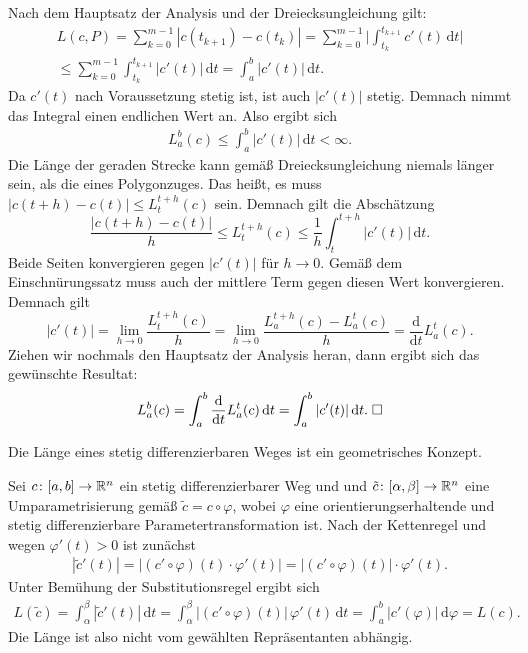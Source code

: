 \noindent{}
Nach dem Hauptsatz der Analysis und der Dreiecksungleichung gilt:
\begin{gather}
L(c,P) = \sum_{k=0}^{m-1} |c(t_{k+1})-c(t_k)|
= \sum_{k=0}^{m-1} \Big|\int_{t_k}^{t_{k+1}}c'(t)\,\mathrm dt\Big|\\
\le \sum_{k=0}^{m-1} \int_{t_k}^{t_{k+1}} |c'(t)|\,\mathrm dt
= \int_a^b |c'(t)|\,\mathrm dt.
\end{gather}
Da $c'(t)$ nach Voraussetzung stetig ist, ist auch $|c'(t)|$
stetig. Demnach nimmt das Integral einen endlichen Wert an. Also ergibt
sich
\begin{gather}
L_a^b(c) \le \int_a^b |c'(t)|\,\mathrm dt < \infty.
\end{gather}
Die Länge der geraden Strecke kann gemäß Dreiecksungleichung niemals
länger sein, als die eines Polygonzuges. Das heißt, es muss
$|c(t+h)-c(t)|\le L_t^{t+h}(c)$ sein. Demnach
gilt die Abschätzung
\begin{equation}
\frac{|c(t+h)-c(t)|}{h}\le L_t^{t+h}(c)
\le\frac{1}{h}\int_t^{t+h} |c'(t)|\,\mathrm dt.
\end{equation}
Beide Seiten konvergieren gegen $|c'(t)|$ für $h\to 0$.
Gemäß dem Einschnürungssatz muss auch der mittlere Term gegen diesen
Wert konvergieren. Demnach gilt
\begin{equation}
|c'(t)| = \lim_{h\to 0}\frac{L_t^{t+h}(c)}{h}
= \lim_{h\to 0}\frac{L_a^{t+h}(c)-L_a^t(c)}{h}
= \frac{\mathrm d}{\mathrm dt} L_a^t(c).
\end{equation}
Ziehen wir nochmals den Hauptsatz der Analysis heran, dann ergibt
sich das gewünschte Resultat:
\begin{equation}
L_a^b(c) = \int_a^b \frac{\mathrm d}{\mathrm dt} L_a^t(c)\,\mathrm dt
= \int_a^b |c'(t)|\,\mathrm dt.\;\Box
\end{equation}

\begin{theorem}
Die Länge eines stetig differenzierbaren Weges ist ein geometrisches
Konzept.
\end{theorem}

\noindent{}
Sei $c\colon [a,b]\to\mathbb R^n$ ein stetig differenzierbarer Weg und
und $\tilde c\colon [\alpha,\beta]\to\mathbb R^n$ eine Umparametrisierung
gemäß $\tilde c = c\circ\varphi$, wobei $\varphi$ eine
orientierungserhaltende und stetig differenzierbare Parametertransformation
ist. Nach der Kettenregel und wegen $\varphi'(t)>0$ ist zunächst
\begin{gather}
|\tilde c'(t)| = |(c'\circ\varphi)(t)\cdot\varphi'(t)|
= |(c'\circ\varphi)(t)|\cdot\varphi'(t).
\end{gather}
Unter Bemühung der Substitutionsregel ergibt sich
\begin{gather}
L(\tilde c) = \int_\alpha^\beta |\tilde c'(t)|\,\mathrm dt
= \int_\alpha^\beta |(c'\circ\varphi)(t)|\,\varphi'(t)\,\mathrm dt
= \int_a^b |c'(\varphi)|\,\mathrm d\varphi = L(c).
\end{gather}
Die Länge ist also nicht vom gewählten Repräsentanten
abhängig.\;\qedsymbol

